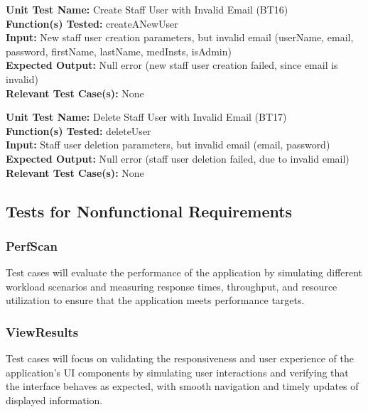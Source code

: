 \documentclass[12pt, titlepage]{article}
\begin{document}
\begin{mdframed}[linewidth=0.5mm]
  \textbf{Unit Test Name:} Create Staff User with Invalid Email (BT16) \\
  \textbf{Function(s) Tested:} createANewUser \\
  \textbf{Input:} New staff user creation parameters, but invalid email (userName, email, password, firstName, lastName, medInsts, isAdmin) \\
  \textbf{Expected Output:} Null error (new staff user creation failed, since email is invalid) \\
  \textbf{Relevant Test Case(s):} None
\end{mdframed}

\begin{mdframed}[linewidth=0.5mm]
  \textbf{Unit Test Name:} Delete Staff User with Invalid Email (BT17) \\
  \textbf{Function(s) Tested:} deleteUser \\
  \textbf{Input:} Staff user deletion parameters, but invalid email (email, password) \\
  \textbf{Expected Output:} Null error (staff user deletion failed, due to invalid email) \\
  \textbf{Relevant Test Case(s):} None
\end{mdframed}

\subsection{Tests for Nonfunctional Requirements}

\subsubsection{PerfScan}    
Test cases will evaluate the performance of the application by simulating different workload scenarios and measuring response times, throughput, and resource utilization to ensure that the application meets performance targets.

\subsubsection{ViewResults}
Test cases will focus on validating the responsiveness and user experience of the application's UI components by simulating user interactions and verifying that the interface behaves as expected, with smooth navigation and timely updates of displayed information.
\end{document}
